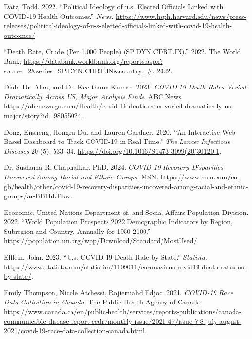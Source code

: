 \documentclass[
  letterpaper,
  DIV=11,
  numbers=noendperiod]{scrartcl}
\newlength{\cslhangindent}
\newlength{\cslentryspacingunit} %
\newenvironment{CSLReferences}[2] %
 {%
  \setlength{\parindent}{0pt}
  \ifodd #1
  \let\oldpar\par
  \def\par{\hangindent=\cslhangindent\oldpar}
  \fi
  \setlength{\parskip}{#2\cslentryspacingunit}
 }%
 {}
\begin{document}
\begin{CSLReferences}{1}{0}
\leavevmode{}%
Datz, Todd. 2022. {``Political Ideology of u.s. Elected Officials Linked
with COVID-19 Health Outcomes.''} \emph{News}.
\url{https://www.hsph.harvard.edu/news/press-releases/political-ideology-of-u-s-elected-officials-linked-with-covid-19-health-outcomes/}.

\leavevmode{}%
{``Death Rate, Crude (Per 1,000 People) (SP.DYN.CDRT.IN).''} 2022. The
World Bank;
\url{https://databank.worldbank.org/reports.aspx?source=2\&series=SP.DYN.CDRT.IN\&country=\#}.
2022.

\leavevmode{}%
Diab, Dr. Alaa, and Dr. Keerthana Kumar. 2023. \emph{COVID-19 Death
Rates Varied Dramatically Across US, Major Analysis Finds}. ABC News.
\url{https://abcnews.go.com/Health/covid-19-death-rates-varied-dramatically-us-major/story?id=98055024}.

\leavevmode{}%
Dong, Ensheng, Hongru Du, and Lauren Gardner. 2020. {``An Interactive
Web-Based Dashboard to Track COVID-19 in Real Time.''} \emph{The Lancet
Infectious Diseases} 20 (5): 533--34.
\url{https://doi.org/10.1016/S1473-3099(20)30120-1}.

\leavevmode{}%
Dr. Sushama R. Chaphalkar, PhD. 2024. \emph{COVID-19 Recovery
Disparities Uncovered Among Racial and Ethnic Groups}. MSN.
\url{https://www.msn.com/en-gb/health/other/covid-19-recovery-disparities-uncovered-among-racial-and-ethnic-groups/ar-BB1hLTLw}.

\leavevmode{}%
Economic, United Nations Department of, and Social Affairs Population
Division. 2022. {``World Population Prospects 2022 Demographic
Indicators by Region, Subregion and Country, Annually for 1950-2100.''}
\url{https://population.un.org/wpp/Download/Standard/MostUsed/}.

\leavevmode{}%
Elflein, John. 2023. {``U.s. COVID-19 Death Rate by State.''}
\emph{Statista}.
\url{https://www.statista.com/statistics/1109011/coronavirus-covid19-death-rates-us-by-state/}.

\leavevmode{}%
Emily Thompson, Nicole Atchessi, Rojiemiahd Edjoc. 2021. \emph{COVID-19
Race Data Collection in Canada}. The Public Health Agency of Canada.
\url{https://www.canada.ca/en/public-health/services/reports-publications/canada-communicable-disease-report-ccdr/monthly-issue/2021-47/issue-7-8-july-august-2021/covid-19-race-data-collection-canada.html}.


\end{CSLReferences}
\end{document}
